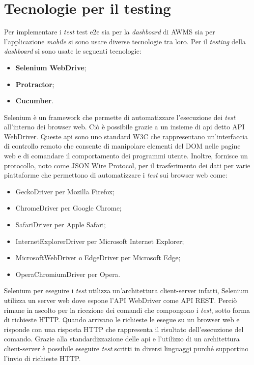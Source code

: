 \section{Tecnologie per il testing}
Per implementare i \emph{test} \gls{test e2e} sia per la \emph{dashboard} di \gls{AWMS} sia per l'applicazione \emph{mobile} si sono usare diverse tecnologie tra loro. Per il \emph{testing} della \emph{dashboard} si sono usate le seguenti tecnologie:
\begin{itemize}
	\item \textbf{Selenium WebDrive};
	\item \textbf{Protractor};
	\item \textbf{Cucumber}.
\end{itemize}
Selenium è un \gls{framework}\ap{[g]} che permette di automatizzare l'esecuzione dei \emph{test} all'interno dei \gls{browser web}\ap{[g]}. Ciò è possibile grazie a un insieme di \gls{api}\ap{[g]} detto API WebDriver. Queste \gls{api}\ap{[g]} sono uno standard W3C che rappresentano un'interfaccia di controllo remoto che consente di manipolare elementi del DOM nelle pagine web e di comandare il comportamento dei programmi utente. Inoltre, fornisce un protocollo, noto come JSON Wire Protocol, per il trasferimento dei dati per varie piattaforme che permettono di automatizzare i \emph{test} sui \gls{browser web}\ap{[g]} come:
\begin{itemize}
	\item GeckoDriver per Mozilla Firefox;
	\item ChromeDriver per Google Chrome;
	\item SafariDriver per Apple Safari;
	\item InternetExplorerDriver per Microsoft Internet Explorer;
	\item MicrosoftWebDriver o EdgeDriver per Microsoft Edge;
	\item OperaChromiumDriver per Opera.
\end{itemize}
Selenium per eseguire i \emph{test} utilizza un’architettura client-server infatti, Selenium utilizza un server web dove espone l'API WebDriver come API REST. Perciò rimane in ascolto per la ricezione dei comandi che compongono i \emph{test}, sotto forma di richieste HTTP. Quando arrivano le richieste le esegue su un \gls{browser web}\ap{[g]} e risponde con una risposta HTTP che rappresenta il risultato dell'esecuzione del comando. Grazie alla standardizzazione delle \gls{api}\ap{[g]} e l'utilizzo di un architettura client-server è possibile eseguire \emph{test} scritti in diversi linguaggi purché supportino l'invio di richieste HTTP.

